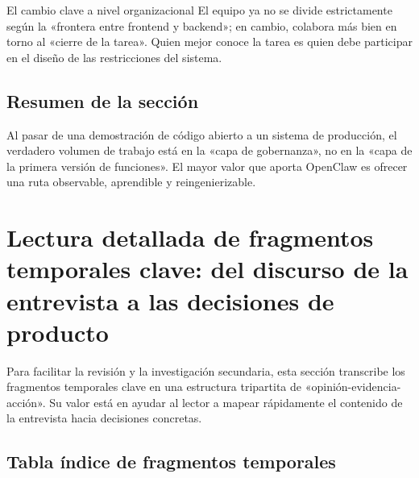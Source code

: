 \documentclass[a4paper]{article}
\begin{document}
\begin{knowledgebox}{El cambio clave a nivel organizacional}
El equipo ya no se divide estrictamente según la «frontera entre frontend y backend»; en cambio, colabora más bien en torno al «cierre de la tarea». Quien mejor conoce la tarea es quien debe participar en el diseño de las restricciones del sistema.
\end{knowledgebox}

\subsection{Resumen de la sección}
Al pasar de una demostración de código abierto a un sistema de producción, el verdadero volumen de trabajo está en la «capa de gobernanza», no en la «capa de la primera versión de funciones». El mayor valor que aporta OpenClaw es ofrecer una ruta observable, aprendible y reingenierizable.

\section{Lectura detallada de fragmentos temporales clave: del discurso de la entrevista a las decisiones de producto}

Para facilitar la revisión y la investigación secundaria, esta sección transcribe los fragmentos temporales clave en una estructura tripartita de «opinión-evidencia-acción». Su valor está en ayudar al lector a mapear rápidamente el contenido de la entrevista hacia decisiones concretas.

\subsection{Tabla índice de fragmentos temporales}
\end{document}
